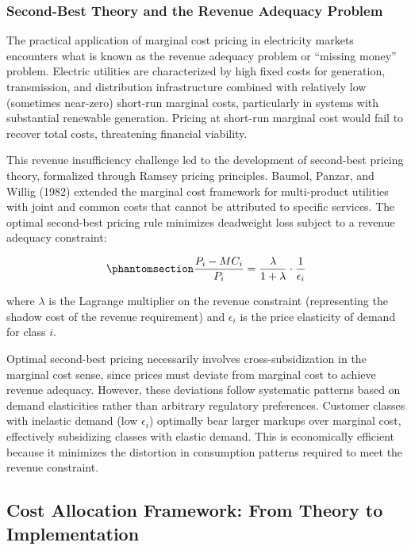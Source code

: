 \documentclass[
  11pt,
]{article}
\begin{document}
\subsubsection{Second-Best Theory and the Revenue Adequacy
Problem}\label{second-best-theory-and-the-revenue-adequacy-problem}

The practical application of marginal cost pricing in electricity
markets encounters what is known as the revenue adequacy problem or
``missing money'' problem. Electric utilities are characterized by high
fixed costs for generation, transmission, and distribution
infrastructure combined with relatively low (sometimes near-zero)
short-run marginal costs, particularly in systems with substantial
renewable generation. Pricing at short-run marginal cost would fail to
recover total costs, threatening financial viability.

This revenue insufficiency challenge led to the development of
second-best pricing theory, formalized through Ramsey pricing
principles. Baumol, Panzar, and Willig (1982) extended the marginal cost
framework for multi-product utilities with joint and common costs that
cannot be attributed to specific services. The optimal second-best
pricing rule minimizes deadweight loss subject to a revenue adequacy
constraint:

\begin{equation}\phantomsection\label{eq-ramsey}{\frac{P_i - MC_i}{P_i} = \frac{\lambda}{1 + \lambda} \cdot \frac{1}{\epsilon_i}}\end{equation}

where \(\lambda\) is the Lagrange multiplier on the revenue constraint
(representing the shadow cost of the revenue requirement) and
\(\epsilon_i\) is the price elasticity of demand for class \(i\).

Optimal second-best pricing necessarily involves cross-subsidization in
the marginal cost sense, since prices must deviate from marginal cost to
achieve revenue adequacy. However, these deviations follow systematic
patterns based on demand elasticities rather than arbitrary regulatory
preferences. Customer classes with inelastic demand (low \(\epsilon_i\))
optimally bear larger markups over marginal cost, effectively
subsidizing classes with elastic demand. This is economically efficient
because it minimizes the distortion in consumption patterns required to
meet the revenue constraint.

\subsection{Cost Allocation Framework: From Theory to
Implementation}\label{cost-allocation-framework-from-theory-to-implementation}
\end{document}
